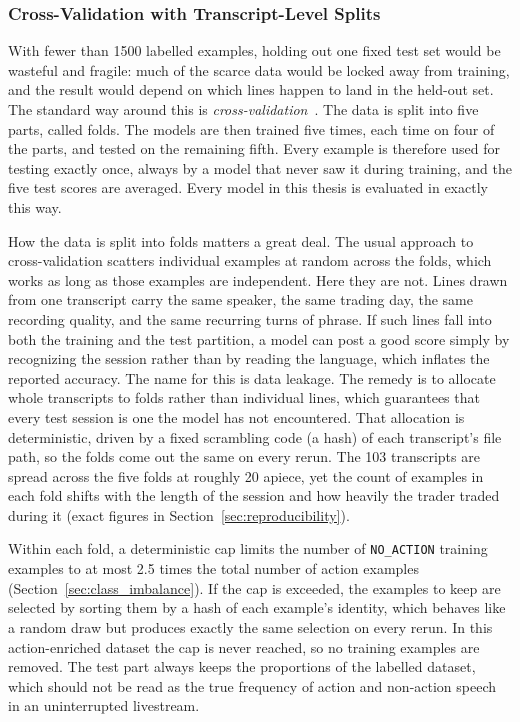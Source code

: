 \subsubsection{Cross-Validation with Transcript-Level Splits}

With fewer than 1500 labelled examples, holding out one fixed test set would be wasteful and fragile: much of the scarce data would be locked away from training, and the result would depend on which lines happen to land in the held-out set. The standard way around this is \emph{cross-validation}~\cite{kohavi1995study}. The data is split into five parts, called folds. The models are then trained five times, each time on four of the parts, and tested on the remaining fifth. Every example is therefore used for testing exactly once, always by a model that never saw it during training, and the five test scores are averaged. Every model in this thesis is evaluated in exactly this way.

How the data is split into folds matters a great deal. The usual approach to cross-validation scatters individual examples at random across the folds, which works as long as those examples are independent. Here they are not. Lines drawn from one transcript carry the same speaker, the same trading day, the same recording quality, and the same recurring turns of phrase. If such lines fall into both the training and the test partition, a model can post a good score simply by recognizing the session rather than by reading the language, which inflates the reported accuracy. The name for this is data leakage. The remedy is to allocate whole transcripts to folds rather than individual lines, which guarantees that every test session is one the model has not encountered. That allocation is deterministic, driven by a fixed scrambling code (a hash) of each transcript's file path, so the folds come out the same on every rerun. The 103 transcripts are spread across the five folds at roughly 20 apiece, yet the count of examples in each fold shifts with the length of the session and how heavily the trader traded during it (exact figures in Section~\ref{sec:reproducibility}).

Within each fold, a deterministic cap limits the number of \texttt{NO\_ACTION} training examples to at most 2.5 times the total number of action examples (Section~\ref{sec:class_imbalance}). If the cap is exceeded, the examples to keep are selected by sorting them by a hash of each example's identity, which behaves like a random draw but produces exactly the same selection on every rerun. In this action-enriched dataset the cap is never reached, so no training examples are removed. The test part always keeps the proportions of the labelled dataset, which should not be read as the true frequency of action and non-action speech in an uninterrupted livestream.

